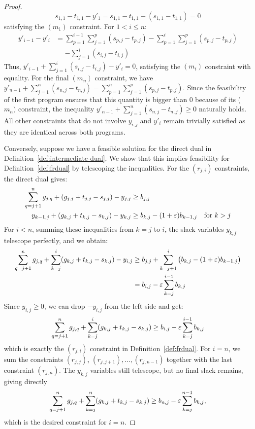 \begin{proof}
    \begin{equation*}
        s_{1,1} - t_{1,1} - y'_1 = s_{1,1} - t_{1,1} - (s_{1,1} - t_{1,1}) = 0
    \end{equation*}
    satisfying the $(m_1)$ constraint.
    For $1 < i \le n$:
    \begin{align*}
        y'_{i-1} - y'_i &= \sum_{p=1}^{i-1} \sum_{j=1}^p (s_{p,j} - t_{p,j}) - \sum_{p=1}^i \sum_{j=1}^p (s_{p,j} - t_{p,j}) \\
        &= - \sum_{j=1}^i (s_{i,j} - t_{i,j})
    \end{align*}
    Thus, $y'_{i-1} + \sum_{j=1}^i (s_{i,j} - t_{i,j}) - y'_i = 0$, satisfying the $(m_i)$ constraint with equality.
    For the final $(m_n)$ constraint, we have $y'_{n-1} + \sum_{j=1}^n (s_{n,j} - t_{n,j}) = \sum_{p=1}^{n} \sum_{j=1}^p (s_{p,j} - t_{p,j})$. Since the feasibility of the first program ensures that this quantity is bigger than $0$ because of its ($m_{n})$ constraint, the inequality $y'_{n-1} + \sum_{j=1}^n (s_{n,j} - t_{n,j}) \ge 0$ naturally holds. All other constraints that do not involve $y_{i,j}$ and $y'_i$ remain trivially satisfied as they are identical across both programs.
    
    Conversely, suppose we have a feasible solution for the direct dual in Definition~\ref{def:intermediate-dual}. We show that this implies feasibility for Definition~\ref{def:frdual} by telescoping the inequalities.
    For the $(r_{j,i})$ constraints, the direct dual gives:
    \begin{align*}
        \sum_{q=j+1}^n g_{j,q} + (g_{j,j} + t_{j,j} - s_{j,j}) - y_{j,j} &\geq b_{j,j} \\
        y_{k-1,j} + (g_{k,j} + t_{k,j} - s_{k,j}) - y_{k,j} &\geq b_{k,j} - (1+\varepsilon) b_{k-1,j} \quad \text{for } k > j
    \end{align*}
    For $i<n$, summing these inequalities from $k=j$ to $i$, the slack variables $y_{k,j}$ telescope perfectly, and we obtain:
    \begin{align*}
        \sum_{q=j+1}^n g_{j,q} + \sum_{k=j}^i (g_{k,j} + t_{k,j} - s_{k,j}) - y_{i,j} &\geq b_{j,j} + \sum_{k=j+1}^i \big( b_{k,j} - (1+\varepsilon) b_{k-1,j} \big) \\
        &= b_{i,j} - \varepsilon \sum_{k=j}^{i-1} b_{k,j}
    \end{align*}
    Since $y_{i,j} \geq 0$, we can drop $-y_{i,j}$ from the left side and get:
    \begin{equation*}
        \sum_{q=j+1}^n g_{j,q} + \sum_{k=j}^i (g_{k,j} + t_{k,j} - s_{k,j}) \geq b_{i,j} - \varepsilon \sum_{k=j}^{i-1} b_{k,j}
    \end{equation*}
    which is exactly the $(r_{j,i})$ constraint in Definition~\ref{def:frdual}. For $i=n$, we sum the constraints $(r_{j,j})$, $(r_{j,j+1}), \ldots, (r_{j,n-1})$ together with the last constraint $(r_{j,n})$. The $y_{k,j}$ variables still telescope, but no final slack remains, giving directly
    \begin{equation*}
        \sum_{q=j+1}^n g_{j,q} + \sum_{k=j}^n (g_{k,j} + t_{k,j} - s_{k,j}) \geq b_{n,j} - \varepsilon \sum_{k=j}^{n-1} b_{k,j},
    \end{equation*}
    which is the desired constraint for $i=n$.
    

\end{proof}
